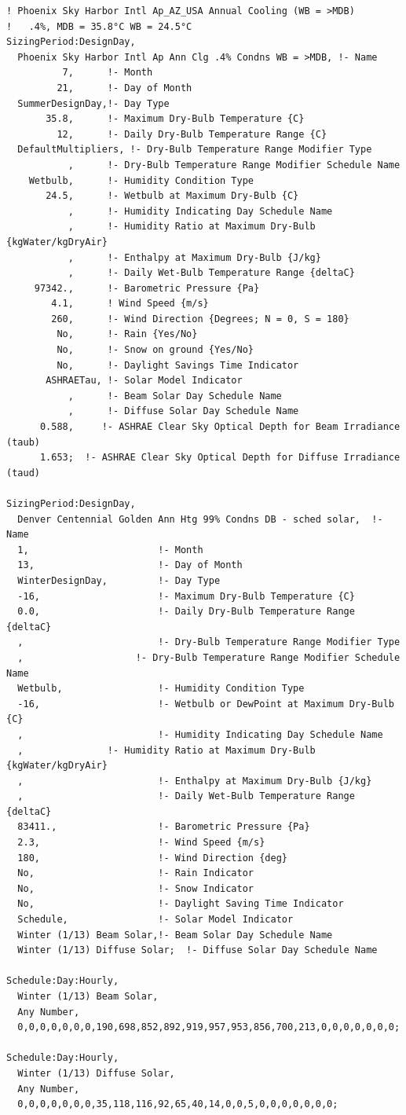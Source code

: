 \begin{lstlisting}
! Phoenix Sky Harbor Intl Ap_AZ_USA Annual Cooling (WB = >MDB)
!   .4%, MDB = 35.8°C WB = 24.5°C
SizingPeriod:DesignDay,
  Phoenix Sky Harbor Intl Ap Ann Clg .4% Condns WB = >MDB, !- Name
          7,      !- Month
         21,      !- Day of Month
  SummerDesignDay,!- Day Type
       35.8,      !- Maximum Dry-Bulb Temperature {C}
         12,      !- Daily Dry-Bulb Temperature Range {C}
  DefaultMultipliers, !- Dry-Bulb Temperature Range Modifier Type
           ,      !- Dry-Bulb Temperature Range Modifier Schedule Name
    Wetbulb,      !- Humidity Condition Type
       24.5,      !- Wetbulb at Maximum Dry-Bulb {C}
           ,      !- Humidity Indicating Day Schedule Name
           ,      !- Humidity Ratio at Maximum Dry-Bulb {kgWater/kgDryAir}
           ,      !- Enthalpy at Maximum Dry-Bulb {J/kg}
           ,      !- Daily Wet-Bulb Temperature Range {deltaC}
     97342.,      !- Barometric Pressure {Pa}
        4.1,      ! Wind Speed {m/s}
        260,      !- Wind Direction {Degrees; N = 0, S = 180}
         No,      !- Rain {Yes/No}
         No,      !- Snow on ground {Yes/No}
         No,      !- Daylight Savings Time Indicator
       ASHRAETau, !- Solar Model Indicator
           ,      !- Beam Solar Day Schedule Name
           ,      !- Diffuse Solar Day Schedule Name
      0.588,     !- ASHRAE Clear Sky Optical Depth for Beam Irradiance (taub)
      1.653;  !- ASHRAE Clear Sky Optical Depth for Diffuse Irradiance (taud)

SizingPeriod:DesignDay,
  Denver Centennial Golden Ann Htg 99% Condns DB - sched solar,  !- Name
  1,                       !- Month
  13,                      !- Day of Month
  WinterDesignDay,         !- Day Type
  -16,                     !- Maximum Dry-Bulb Temperature {C}
  0.0,                     !- Daily Dry-Bulb Temperature Range {deltaC}
  ,                        !- Dry-Bulb Temperature Range Modifier Type
  ,                    !- Dry-Bulb Temperature Range Modifier Schedule Name
  Wetbulb,                 !- Humidity Condition Type
  -16,                     !- Wetbulb or DewPoint at Maximum Dry-Bulb {C}
  ,                        !- Humidity Indicating Day Schedule Name
  ,               !- Humidity Ratio at Maximum Dry-Bulb {kgWater/kgDryAir}
  ,                        !- Enthalpy at Maximum Dry-Bulb {J/kg}
  ,                        !- Daily Wet-Bulb Temperature Range {deltaC}
  83411.,                  !- Barometric Pressure {Pa}
  2.3,                     !- Wind Speed {m/s}
  180,                     !- Wind Direction {deg}
  No,                      !- Rain Indicator
  No,                      !- Snow Indicator
  No,                      !- Daylight Saving Time Indicator
  Schedule,                !- Solar Model Indicator
  Winter (1/13) Beam Solar,!- Beam Solar Day Schedule Name
  Winter (1/13) Diffuse Solar;  !- Diffuse Solar Day Schedule Name

Schedule:Day:Hourly,
  Winter (1/13) Beam Solar,
  Any Number,
  0,0,0,0,0,0,0,190,698,852,892,919,957,953,856,700,213,0,0,0,0,0,0,0;

Schedule:Day:Hourly,
  Winter (1/13) Diffuse Solar,
  Any Number,
  0,0,0,0,0,0,0,35,118,116,92,65,40,14,0,0,5,0,0,0,0,0,0,0;
\end{lstlisting}

